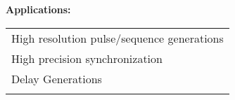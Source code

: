 \vspace{0.4cm}
\noindent\sanhao\textbf{Applications:}
\vspace{0.3cm}
\song
\begin{table}[H]
{}
\begin{tabular}{m{13.5cm}}
\rowcolor{gray!20}
\arrayrulecolor{tabcolor_top}\toprule[1.8pt]
High resolution pulse/sequence generations\\\arrayrulecolor{tabcolor}\midrule[1.2pt]
High precision synchronization \\\arrayrulecolor{tabcolor}\midrule[1.2pt]
Delay Generations\\\arrayrulecolor{tabcolor}\midrule[1.2pt]
\arrayrulecolor{tabcolor_top}\bottomrule[1.8pt]
\end{tabular}
\end{table}

\newpage
\qquad

